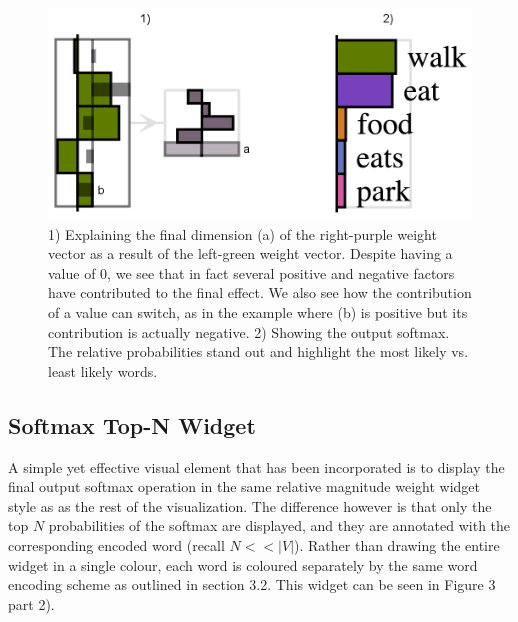 \documentclass[journal]{vgtc}                %
\begin{document}
\begin{figure}[tb]
 \centering %
 \includegraphics[width=\linewidth]{weight_explain_and_softmax.png}
 \caption{1) Explaining the final dimension (a) of the right-purple weight vector as a result of the left-green weight vector.  Despite having a value of 0, we see that in fact several positive and negative factors have contributed to the final effect.  We also see how the contribution of a value can switch, as in the example where (b) is positive but its contribution is actually negative.  2) Showing the output softmax.  The relative probabilities stand out and highlight the most likely vs. least likely words.}
 \label{fig:weight_explain}
\end{figure}

\subsection{Softmax Top-N Widget}
A simple yet effective visual element that has been incorporated is to display the final output softmax operation in the same relative magnitude weight widget style as as the rest of the visualization.
The difference however is that only the top $N$ probabilities of the softmax are displayed, and they are annotated with the corresponding encoded word (recall $N << |V|$).
Rather than drawing the entire widget in a single colour, each word is coloured separately by the same word encoding scheme as outlined in section 3.2.
This widget can be seen in Figure 3 part 2).
\end{document}

